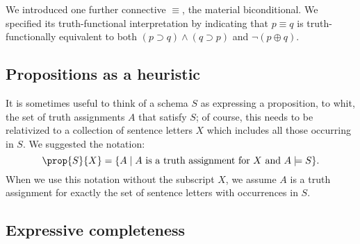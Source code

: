 We introduced one further connective $\equiv$, the material biconditional. We specified its truth-functional interpretation by indicating that $p\equiv q$ is truth-functionally equivalent to both $(p\supset q)\wedge (q\supset p)$ and $\neg(p\oplus q)$. 
\subsection{Propositions as a heuristic}
It is sometimes useful to think of a schema $S$ as expressing a proposition, to whit, the set of truth assignments $A$ that satisfy $S$; of course, this needs to be relativized to a collection of sentence letters $X$ which includes all those occurring in $S$. We suggested the notation: 
\[\prop{S}{X} = \{ A\mid A\  \mbox{is a truth assignment for $X$ and } A\models S\}.
\]
 When we use this notation without the subscript $X$, we assume $A$ is a truth assignment for exactly the set of sentence letters with occurrences in $S$. %
\subsection{Expressive completeness}

